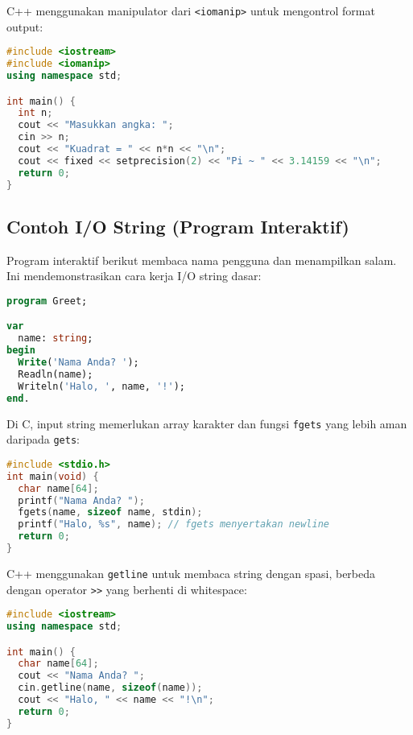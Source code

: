 \documentclass[../main.tex]{subfiles}
\begin{document}
C++ menggunakan manipulator dari \texttt{<iomanip>} untuk mengontrol format output:

\begin{lstlisting}[language=C++, caption={Baca integer dan format keluaran (C++)}]
#include <iostream>
#include <iomanip>
using namespace std;

int main() {
  int n;
  cout << "Masukkan angka: ";
  cin >> n;
  cout << "Kuadrat = " << n*n << "\n";
  cout << fixed << setprecision(2) << "Pi ~ " << 3.14159 << "\n";
  return 0;
}
\end{lstlisting}

\subsection{Contoh I/O String (Program Interaktif)}

Program interaktif berikut membaca nama pengguna dan menampilkan salam. Ini mendemonstrasikan cara kerja I/O string dasar:

\begin{lstlisting}[language=Pascal, caption={Input nama pada Pascal}]
program Greet;

var
  name: string;
begin
  Write('Nama Anda? ');
  Readln(name);
  Writeln('Halo, ', name, '!');
end.
\end{lstlisting}

Di C, input string memerlukan array karakter dan fungsi \texttt{fgets} yang lebih aman daripada \texttt{gets}:

\begin{lstlisting}[language=C, caption={Input nama pada C}]
#include <stdio.h>
int main(void) {
  char name[64];
  printf("Nama Anda? ");
  fgets(name, sizeof name, stdin);
  printf("Halo, %s", name); // fgets menyertakan newline
  return 0;
}
\end{lstlisting}

C++ menggunakan \texttt{getline} untuk membaca string dengan spasi, berbeda dengan operator \texttt{>>} yang berhenti di whitespace:

\begin{lstlisting}[language=C++, caption={Input nama pada C++}]
#include <iostream>
using namespace std;

int main() {
  char name[64];
  cout << "Nama Anda? ";
  cin.getline(name, sizeof(name));
  cout << "Halo, " << name << "!\n";
  return 0;
}
\end{lstlisting}
\end{document}
